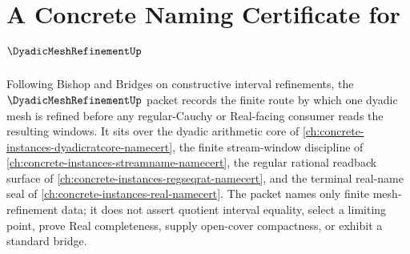\chapter{A Concrete Naming Certificate for $\DyadicMeshRefinementUp$}
\label{ch:concrete-instances-dyadic-mesh-refinement-namecert}

Following Bishop and Bridges on constructive interval refinements, the $\DyadicMeshRefinementUp$ packet records the finite route by which one dyadic mesh is refined before any regular-Cauchy or Real-facing consumer reads the resulting windows. It sits over the dyadic arithmetic core of \autoref{ch:concrete-instances-dyadicratcore-namecert}, the finite stream-window discipline of \autoref{ch:concrete-instances-streamname-namecert}, the regular rational readback surface of \autoref{ch:concrete-instances-regseqrat-namecert}, and the terminal real-name seal of \autoref{ch:concrete-instances-real-namecert}. The packet names only finite mesh-refinement data; it does not assert quotient interval equality, select a limiting point, prove Real completeness, supply open-cover compactness, or exhibit a standard bridge.

